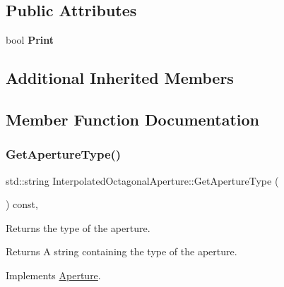 \subsection*{Public Attributes}
\begin{DoxyCompactItemize}
\item 
\mbox{\label{classInterpolatedOctagonalAperture_a4e8414a4ca5807baaa27b994da732183}} 
bool {\bfseries Print}
\end{DoxyCompactItemize}
\subsection*{Additional Inherited Members}


\subsection{Member Function Documentation}
\mbox{\label{classInterpolatedOctagonalAperture_a9e16536001e2732bcaf15d55134e05bf}} 
\subsubsection{\texorpdfstring{Get\+Aperture\+Type()}{GetApertureType()}}
{\footnotesize\ttfamily std\+::string Interpolated\+Octagonal\+Aperture\+::\+Get\+Aperture\+Type (\begin{DoxyParamCaption}{ }\end{DoxyParamCaption}) const\hspace{0.3cm}{\ttfamily [inline]}, {\ttfamily [virtual]}}

Returns the type of the aperture. \begin{DoxyReturn}{Returns}
A string containing the type of the aperture. 
\end{DoxyReturn}


Implements \hyperlink{classAperture_ad7af612271a0586feea83c38549dfb75}{Aperture}.

\mbox{\label{classInterpolatedOctagonalAperture_a92937e111009433a274722eb316270e1}} 
